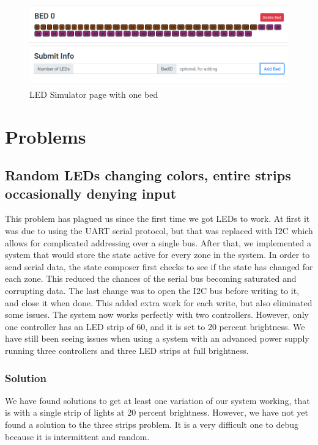 \documentclass[onecolumn, draftclsnofoot,10pt, compsoc]{IEEEtran}
\begin{document}
		\begin{center}
			\begin{figure}[H]
				\includegraphics[width=\linewidth]{site/simulator.png}
				\caption{LED Simulator page with one bed}
				\label{fig:siteSimulator}
			\end{figure}
		\end{center}


	\section{Problems}
		\subsection{Random LEDs changing colors, entire strips occasionally denying input}
			This problem has plagued us since the first time we got LEDs to work.
			At first it was due to using the UART serial protocol, but that was replaced with I2C which allows for complicated addressing over a single bus.
			After that, we implemented a system that would store the state active for every zone in the system.
			In order to send serial data, the state composer first checks to see if the state has changed for each zone.
			This reduced the chances of the serial bus becoming saturated and corrupting data.
			The last change was to open the I2C bus before writing to it, and close it when done. This added extra work for each write, but also eliminated some issues.
			The system now works perfectly with two controllers. However, only one controller has an LED strip of 60, and it is set to 20 percent brightness.
			We have still been seeing issues when using a system with an advanced power supply running three controllers and three LED strips at full brightness.

			\subsubsection{Solution}
				We have found solutions to get at least one variation of our system working, that is with a single strip of lights at 20 percent brightness.
				However, we have not yet found a solution to the three strips problem. It is a very difficult one to debug because it is intermittent and random.
\end{document}
